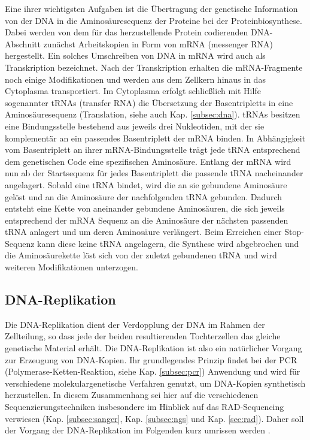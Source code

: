 Eine ihrer wichtigsten Aufgaben ist die Übertragung der genetische Information von der DNA in die Aminosäuresequenz der Proteine bei der Proteinbiosynthese. Dabei werden von dem für das herzustellende Protein codierenden DNA-Abschnitt zunächst Arbeitskopien in Form von mRNA (messenger RNA) hergestellt. Ein solches Umschreiben von DNA in mRNA wird auch als Transkription bezeichnet. Nach der Transkription erhalten die mRNA-Fragmente noch einige Modifikationen und werden aus dem Zellkern hinaus in das Cytoplasma transportiert. Im Cytoplasma erfolgt schließlich mit Hilfe sogenannter tRNAs (transfer RNA) die Übersetzung der Basentripletts in eine Aminosäuresequenz (Translation, siehe auch Kap. \ref{subsec:dna}). tRNAs besitzen eine Bindungsstelle bestehend aus jeweils drei Nukleotiden, mit der sie komplementär an ein passendes Basentriplett der mRNA binden. In Abhängigkeit vom Basentriplett an ihrer mRNA-Bindungsstelle trägt jede tRNA entsprechend dem genetischen Code eine spezifischen Aminosäure. Entlang der mRNA wird nun ab der Startsequenz für jedes Basentriplett die passende tRNA nacheinander angelagert. Sobald eine tRNA bindet, wird die an sie gebundene Aminosäure gelöst und an die Aminosäure der nachfolgenden tRNA gebunden. Dadurch entsteht eine Kette von aneinander gebundene Aminosäuren, die sich jeweils entsprechend der mRNA Sequenz an die Aminosäure der nächsten passenden tRNA anlagert und um deren Aminosäure verlängert. Beim Erreichen einer Stop-Sequenz kann diese keine tRNA angelagern, die Synthese wird abgebrochen und die Aminosäurekette löst sich von der zuletzt gebundenen tRNA und wird weiteren Modifikationen unterzogen. \\

\subsection{DNA-Replikation} \label{subsec:replication}

Die DNA-Replikation dient der Verdopplung der DNA im Rahmen der Zellteilung, so dass jede der beiden resultierenden Tochterzellen das gleiche genetische Material erhält. Die DNA-Replikation ist also ein natürlicher Vorgang zur Erzeugung von DNA-Kopien. Ihr grundlegendes Prinzip findet bei der PCR (Polymerase-Ketten-Reaktion, siehe Kap. \ref{subsec:pcr}) Anwendung und wird für verschiedene molekulargenetische Verfahren genutzt, um DNA-Kopien synthetisch herzustellen. In diesem Zusammenhang sei hier auf die verschiedenen Sequenzierungstechniken insbesondere im Hinblick auf das RAD-Sequencing verwiesen (Kap. \ref{subsec:sanger}, Kap. \ref{subsec:ngs} und Kap. \ref{sec:rad}). Daher soll der Vorgang der DNA-Replikation im Folgenden kurz umrissen werden \cite{odonell_2013, chargin_2010, prioleau_2016}. \\

